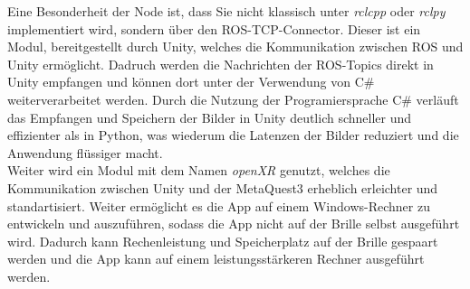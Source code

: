 Eine Besonderheit der Node ist, dass Sie nicht klassisch unter \textit{rclcpp} oder \textit{rclpy} implementiert wird, sondern über den \ac{ROS}-\ac{TCP}-Connector. Dieser ist ein Modul, bereitgestellt durch Unity, welches die Kommunikation zwischen \ac{ROS} und Unity ermöglicht. Dadruch werden die Nachrichten der \ac{ROS}-Topics direkt in Unity empfangen und können dort unter der Verwendung von C\# weiterverarbeitet werden. Durch die Nutzung der Programiersprache C\# verläuft das Empfangen und Speichern der Bilder in Unity deutlich schneller und effizienter als in Python, was wiederum die Latenzen der Bilder reduziert und die Anwendung flüssiger macht.\\
Weiter wird ein Modul mit dem Namen \textit{openXR} genutzt, welches die Kommunikation zwischen Unity und der MetaQuest3 erheblich erleichter und standartisiert. Weiter ermöglicht es die App auf einem Windows-Rechner zu entwickeln und auszuführen, sodass die App nicht auf der Brille selbst ausgeführt wird. Dadurch kann Rechenleistung und Speicherplatz auf der Brille gespaart werden und die App kann auf einem leistungsstärkeren Rechner ausgeführt werden.\\

